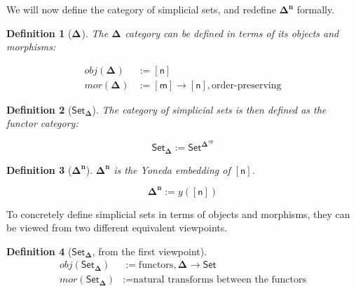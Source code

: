 \documentclass[10pt, titlepage]{amsart}
\newtheorem{definition}{Definition}
\newcommand{\Simplex}[1]{\ensuremath{\boldsymbol{\Delta^{#1}}}}
\newcommand{\SSet}{\ensuremath{\mathsf{Set}_{\boldsymbol{\Delta}}}}
\newcommand{\Set}{\ensuremath{\mathsf{Set}}}
\newcommand{\sq}[1]{\ensuremath{\mathsf{[#1]}}}
\begin{document}
We will now define the category of simplicial sets, and redefine $\Simplex{n}$ formally.

\begin{definition}[\Simplex{}]
  The $\Simplex{}$ category can be defined in terms of its objects and morphisms:

  \begin{align*}
    obj(\Simplex{}) & := \sq{n}                                             \\
    mor(\Simplex{}) & := \sq{m} \rightarrow \sq{n}, \text{order-preserving}
  \end{align*}
\end{definition}

\begin{definition}[\SSet]
  The category of simplicial sets is then defined as the functor category:

  \begin{equation*}
    \SSet := \Set^{\Simplex{}^{op}}
  \end{equation*}
\end{definition}

\begin{definition}[\Simplex{n}]
  $\Simplex{n}$ is the Yoneda embedding of \sq{n}.

  \begin{equation*}
    \Simplex{n} := y(\sq{n})
  \end{equation*}
\end{definition}

To concretely define simplicial sets in terms of objects and morphisms, they can be viewed from two different equivalent viewpoints.

\begin{definition}[\SSet, from the first viewpoint]
  \begin{align*}
    obj(\SSet) & := \text{functors}, \Simplex{} \rightarrow \Set   \\
    mor(\SSet) & := \text{natural transforms between the functors}
  \end{align*}
\end{definition}
\end{document}
